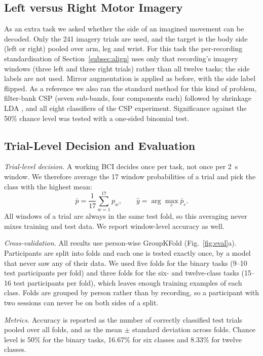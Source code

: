 \documentclass[pdflatex,sn-mathphys-num]{sn-jnl}%
\theoremstyle{thmstyleone}%
\theoremstyle{thmstyletwo}%
\theoremstyle{thmstylethree}%
\begin{document}
\subsection{Left versus Right Motor Imagery}\label{subsec:lr}

As an extra task we asked whether the side of an imagined movement can be decoded. Only the 241 imagery trials are used, and the target is the body side (left or right) pooled over arm, leg and wrist. For this task the per-recording standardisation of Section~\ref{subsec:align} uses only that recording's imagery windows (three left and three right trials) rather than all twelve tasks; the side labels are not used. Mirror augmentation is applied as before, with the side label flipped. As a reference we also ran the standard method for this kind of problem, filter-bank CSP (seven sub-bands, four components each) followed by shrinkage LDA \citep{Ang2012}, and all eight classifiers of the CSP experiment. Significance against the 50\% chance level was tested with a one-sided binomial test.

\subsection{Trial-Level Decision and Evaluation}\label{subsec:eval}

\emph{Trial-level decision.} A working BCI decides once per task, not once per 2~s window. We therefore average the 17 window probabilities of a trial and pick the class with the highest mean:
\begin{equation}
\bar{p} = \frac{1}{17} \sum_{w=1}^{17} p_w, \qquad \hat{y} = \arg\max_c \bar{p}_c.
\end{equation}
All windows of a trial are always in the same test fold, so this averaging never mixes training and test data. We report window-level accuracy as well.

\emph{Cross-validation.} All results use person-wise GroupKFold (Fig.~\ref{fig:eval}a). Participants are split into folds and each one is tested exactly once, by a model that never saw any of their data. We used five folds for the binary tasks (9--10 test participants per fold) and three folds for the six- and twelve-class tasks (15--16 test participants per fold), which leaves enough training examples of each class. Folds are grouped by person rather than by recording, so a participant with two sessions can never be on both sides of a split.

\emph{Metrics.} Accuracy is reported as the number of correctly classified test trials pooled over all folds, and as the mean $\pm$ standard deviation across folds. Chance level is 50\% for the binary tasks, 16.67\% for six classes and 8.33\% for twelve classes.
\end{document}
